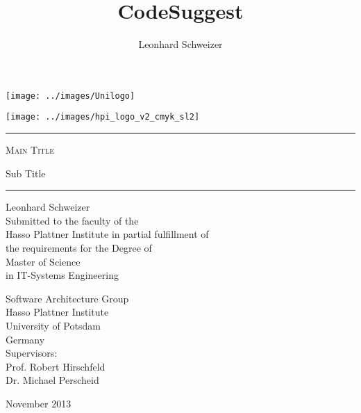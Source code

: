 \title{CodeSuggest}
\author{Leonhard Schweizer}
\begin{titlepage}
\pagestyle{empty}

\noindent
\begin{minipage}[b]{0.4\linewidth}
\noindent
\texttt{[image: ../images/Unilogo]}
\end{minipage}
\hfill
\begin{minipage}[b]{0.4\linewidth}
\hfill
\vspace{3mm}
\texttt{[image: ../images/hpi\_logo\_v2\_cmyk\_sl2]}
\end{minipage}

\vspace{2cm}

\begin{center}
\begin{minipage}{0.7\textwidth}
\begin{center}
\begin{large}
\hrule
\vspace{2em}
\textsc{\Huge Main Title \\[0.5em]}
\begin{doublespace}
  {\LARGE Sub Title}
  \\[1.2em]
\end{doublespace}
\hrule
\vspace{1.5cm}

{\huge Leonhard Schweizer } \\[1.5cm]

Submitted to the faculty of the \\
Hasso Plattner Institute in partial fulfillment of \\
the requirements for the Degree of \\[5mm]
{\Large Master of Science} \\[1mm]
in IT-Systems Engineering \\[2cm]

\begin{multicols}{2}
Software Architecture Group\\
Hasso Plattner Institute\\
University of Potsdam \\
Germany \\
Supervisors: \\
Prof. Robert Hirschfeld \\
Dr. Michael Perscheid \\
\end{multicols}
\end{large}
\end{center}
\end{minipage}
\vfill
{\LARGE November 2013 \\ ~ }
\end{center}
\end{titlepage}
\restoregeometry
\cleardoublepage